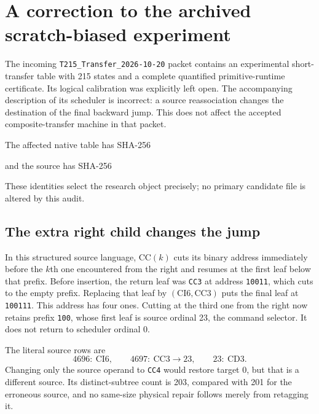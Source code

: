 \section{A correction to the archived scratch-biased experiment}
\label{sec:scratch-return-correction}\label{sec:correction}

The incoming \texttt{T215\_Transfer\_2026-10-20} packet contains an
experimental short-transfer table with 215 states and a complete quantified
primitive-runtime certificate.  Its logical calibration was explicitly left
open.  The accompanying description of its scheduler is incorrect: a source
reassociation changes the destination of the final backward jump.
This does not affect the accepted composite-transfer machine in that packet.

The affected native table has SHA-256
\begin{center}\small{}\end{center}
and the source has SHA-256
\begin{center}\small{}\end{center}
These identities select the research object precisely; no primary candidate
file is altered by this audit.

\subsection{The extra right child changes the jump}
In this structured source language, $\mathrm{CC}(k)$ cuts its binary address
immediately before the $k$th one encountered from the right and resumes at
the first leaf below that prefix.  Before insertion, the return leaf was
\texttt{CC3} at address \texttt{10011}, which cuts to the empty prefix.
Replacing that leaf by $(\mathrm{CI6},\mathrm{CC3})$ puts the final leaf at
\texttt{100111}.  This address has four ones.  Cutting at the third one from
the right now retains prefix \texttt{100}, whose first leaf is source
ordinal 23, the command selector.  It does not return to scheduler ordinal 0.

The literal source rows are
\[
 4696:\ \mathrm{CI6},\qquad
 4697:\ \mathrm{CC3}\longrightarrow 23,\qquad
 23:\ \mathrm{CD3}.
\]
Changing only the source operand to \texttt{CC4} would restore target 0,
but that is a different source.  Its distinct-subtree count is 203, compared
with 201 for the erroneous source, and no same-size physical repair follows
merely from retagging it.

